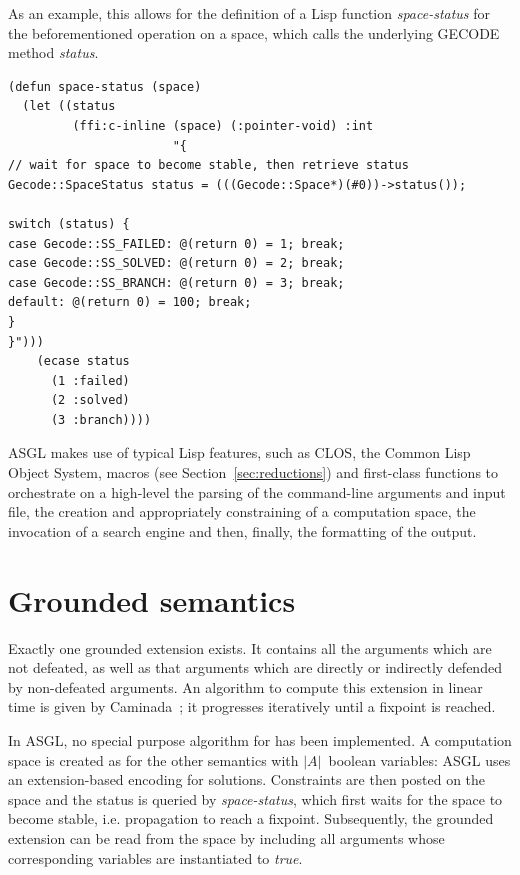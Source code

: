 \documentclass[runningheads,a4paper]{llncs}
\begin{document}
As an example, this allows for the definition of a Lisp function
\textit{space-status} for the beforementioned operation on a space,
which calls the underlying GECODE method \textit{status}.

\begin{scriptsize}
\begin{verbatim}
(defun space-status (space)
  (let ((status
         (ffi:c-inline (space) (:pointer-void) :int
                       "{
// wait for space to become stable, then retrieve status
Gecode::SpaceStatus status = (((Gecode::Space*)(#0))->status());

switch (status) {
case Gecode::SS_FAILED: @(return 0) = 1; break;
case Gecode::SS_SOLVED: @(return 0) = 2; break;
case Gecode::SS_BRANCH: @(return 0) = 3; break;
default: @(return 0) = 100; break;
}
}")))
    (ecase status
      (1 :failed)
      (2 :solved)
      (3 :branch))))
\end{verbatim}
\end{scriptsize}

ASGL makes use of typical Lisp features, such as CLOS, the Common Lisp
Object System, macros (see Section~\ref{sec:reductions}) and
first-class functions to orchestrate on a high-level the parsing of
the command-line arguments and input file, the creation and
appropriately constraining of a computation space, the invocation of a
search engine and then, finally, the formatting of the output.

\section{Grounded semantics}\label{sec:grounded}

Exactly one grounded extension exists. It contains all the arguments
which are not defeated, as well as that arguments which are directly
or indirectly defended by non-defeated arguments. An algorithm to
compute this extension in linear time is given by
Caminada~\cite{Modgil2009}; it progresses iteratively until a fixpoint
is reached.

In ASGL, no special purpose algorithm for \grsem{} has been
implemented. A computation space is created as for the other semantics
with $|A|$~boolean variables: ASGL uses an extension-based encoding
for solutions. Constraints are then posted on the space and the status
is queried by \textit{space-status}, which first waits for the space
to become stable, i.e. propagation to reach a fixpoint. Subsequently,
the grounded extension can be read from the space by including all
arguments whose corresponding variables are instantiated to
\textit{true}.
\end{document}
